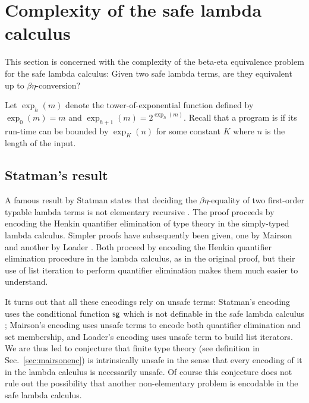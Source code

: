 \newcommand\bigo{\mathcal{O}} %
\newcommand\booltype{\mathsf{B}}
\newcommand\towerexp[2]{\exp_{#1}(#2)}

\section{Complexity of the safe lambda calculus}
This section is concerned with the complexity of the
beta-eta equivalence problem for the safe lambda calculus:
Given two safe lambda terms, are they equivalent up to $\beta\eta$-conversion?



Let $\towerexp{h}{m}$ denote the tower-of-exponential function
defined by $\towerexp{0}{m} = m$ and $\towerexp{h+1}{m} =
2^{\towerexp{h}{m}}$. Recall that a program is
 if its run-time can be bounded by
$\towerexp{K}{n}$ for some constant $K$ where $n$ is the length of
the input.

\subsection{Statman's result}

A famous result by Statman  states that deciding the
$\beta\eta$-equality of two first-order typable lambda terms is not
elementary recursive \cite{Statman:1979:TLE}. The proof proceeds by
encoding the Henkin quantifier elimination of type theory in the
simply-typed lambda calculus. Simpler proofs have subsequently been
given, one by Mairson \cite{mairson1992spt} and another by Loader
\cite{Loader1998}. Both proceed by encoding the Henkin quantifier
elimination procedure in the lambda calculus, as in the original
proof, but their use of list iteration to perform quantifier
elimination makes them much easier to understand.

It turns out that all these encodings rely on unsafe terms:
Statman's encoding uses the conditional function $\sf sg$ which is
not definable in the safe lambda calculus
\cite{blumong:safelambdacalculus}; Mairson's encoding uses unsafe
terms to encode both quantifier elimination and set membership, and
Loader's encoding uses unsafe term to build list iterators. We are
thus led to conjecture that finite type theory (see definition in
Sec.\ \ref{sec:mairsonenc}) is intrinsically unsafe in the sense
that every encoding of it in the lambda calculus is necessarily
unsafe. Of course this conjecture does not rule out the possibility
that another non-elementary problem is encodable in the safe lambda
calculus.

